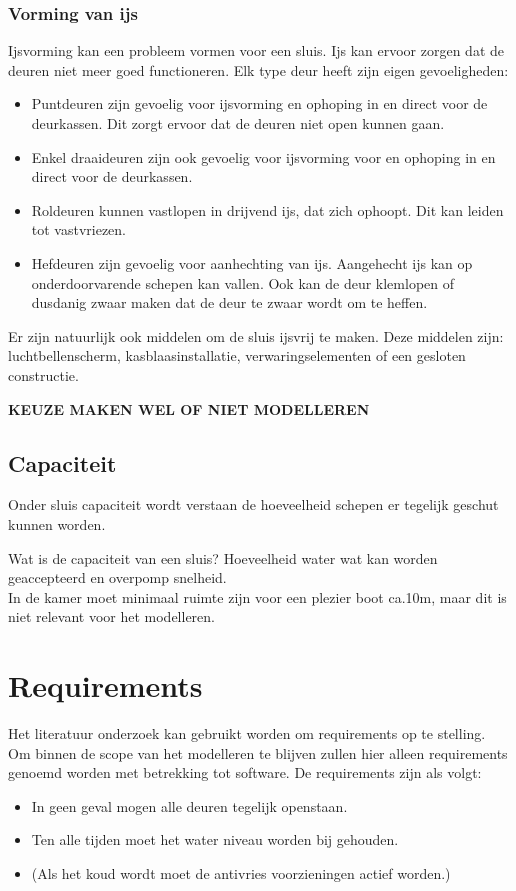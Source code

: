 \documentclass{article}
\begin{document}
\subsubsection{Vorming van ijs}
Ijsvorming kan een probleem vormen voor een sluis. Ijs kan ervoor zorgen dat de deuren niet meer goed functioneren. Elk type deur heeft zijn eigen gevoeligheden:
\begin{itemize}
\item Puntdeuren zijn gevoelig voor ijsvorming en ophoping in en direct voor de deurkassen. Dit zorgt ervoor dat de deuren niet open kunnen gaan.
\item Enkel draaideuren zijn ook gevoelig voor ijsvorming voor en ophoping in en direct voor de deurkassen.
\item Roldeuren kunnen vastlopen in drijvend ijs, dat zich ophoopt. Dit kan leiden tot vastvriezen.
\item Hefdeuren zijn gevoelig voor aanhechting van ijs. Aangehecht ijs kan op onderdoorvarende schepen kan vallen. Ook kan de deur klemlopen of dusdanig zwaar maken dat de deur te zwaar wordt om te heffen.
\end{itemize}

Er zijn natuurlijk ook middelen om de sluis ijsvrij te maken. Deze middelen zijn: luchtbellenscherm, kasblaasinstallatie, verwaringselementen of een gesloten constructie.

\vskip0.5cm

{\large\color{red}\textbf{KEUZE MAKEN WEL OF NIET MODELLEREN}}

\subsection{Capaciteit}
Onder sluis capaciteit wordt verstaan de hoeveelheid schepen er tegelijk geschut kunnen worden.

Wat is de capaciteit van een sluis? Hoeveelheid water wat kan worden geaccepteerd en overpomp snelheid.\\
In de kamer moet minimaal ruimte zijn voor een plezier boot ca.10m, maar dit is niet relevant voor het modelleren.

\clearpage

\section{Requirements} %
Het literatuur onderzoek kan gebruikt worden om requirements op te stelling. Om binnen de scope van het modelleren te blijven zullen hier alleen requirements genoemd worden met betrekking tot software. De requirements zijn als volgt:
\begin{itemize}
\item In geen geval mogen alle deuren tegelijk openstaan.
\item Ten alle tijden moet het water niveau worden bij gehouden.
\item (Als het koud wordt moet de antivries voorzieningen actief worden.)

\end{itemize}
\end{document}
